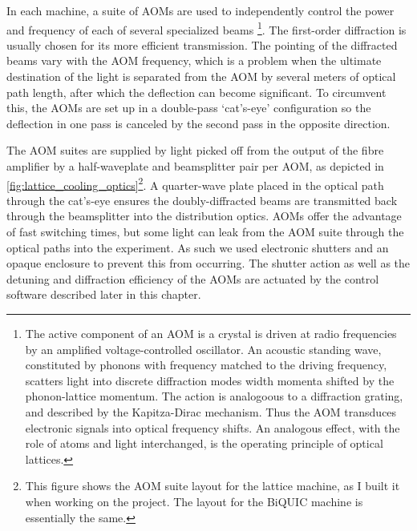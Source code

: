 	In each machine, a suite of AOMs are used to independently control the power and frequency of each of several specialized beams \footnote{The active component of an AOM is a crystal is driven at radio frequencies by an amplified voltage-controlled oscillator.
	An acoustic standing wave, constituted by phonons with frequency matched to the driving frequency, scatters light into discrete diffraction modes width momenta shifted by the phonon-lattice momentum.
	The action is analogoous to a diffraction grating, and described by the Kapitza-Dirac mechanism.
	Thus the AOM transduces electronic signals into optical frequency shifts.
	An analogous effect, with the role of atoms and light interchanged, is the operating principle of optical lattices.}.
	The first-order diffraction is usually chosen for its more efficient transmission.
	The pointing of the diffracted beams vary with the AOM frequency, which is a problem when the ultimate destination of the light is separated from the AOM by several meters of optical path length, after which the deflection can become significant.
	To circumvent this, the AOMs are set up in a double-pass `cat's-eye' configuration so the deflection in one pass is canceled by the second pass in the opposite direction.
	
	The AOM suites are supplied by light picked off from the output of the fibre amplifier by a half-waveplate and beamsplitter pair per AOM, as depicted in \ref{fig:lattice_cooling_optics}\footnote{This figure shows the AOM suite layout for the lattice machine, as I built it when working on the project.
	The layout for the BiQUIC machine is essentially the same.}.
	A quarter-wave plate placed in the optical path through the cat's-eye ensures the doubly-diffracted beams are transmitted back through the beamsplitter into the distribution optics.
	AOMs offer the advantage of fast switching times, but some light can leak from the AOM suite through the optical paths into the experiment.
	As such we used electronic shutters and an opaque enclosure to prevent this from occurring.
	The shutter action as well as the detuning and diffraction efficiency of the AOMs are actuated by the control software described later in this chapter.
	
	


